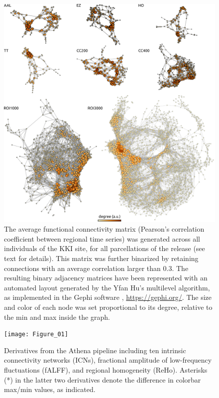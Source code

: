 \documentclass[preprint,12pt,3p]{elsarticle}
\begin{document}
\begin{figure}[!t]
\begin{center}
  \includegraphics[width=\linewidth]{fig_connectomes}
  \caption{The average functional connectivity matrix (Pearson's correlation coefficient between regional time series) was generated across all individuals of the KKI site, for all parcellations of the release (see text for details). This matrix was further binarized by retaining connections with an average correlation larger than 0.3. The resulting binary adjacency matrices have been represented with an automated layout generated by the Yfan Hu's multilevel algorithm, as implemented in the Gephi software \cite{bastian2009gephi}, \url{https://gephi.org/}. The size and color of each node was set proportional to its degree, relative to the min and max inside the graph.}   
  \label{fig:connectomes}
\end{center}
\end{figure}


\begin{figure}[!t]
\begin{center}
  \texttt{[image: Figure\_01]}
  \caption{Derivatives from the Athena pipeline including ten intrinsic connectivity networks (ICNs), fractional amplitude of low-frequency fluctuations (fALFF), and regional homogeneity (ReHo). Asterisks (*) in the latter two derivatives denote the difference in colorbar max/min values, as indicated.}
  \label{fig:derivatives}
\end{center}
\end{figure}
\end{document}
